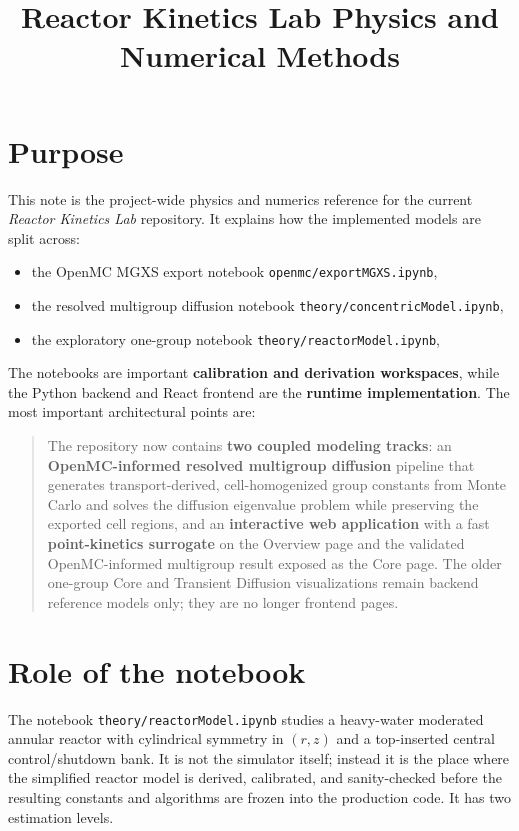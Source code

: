 \documentclass[11pt]{article}
\title{Reactor Kinetics Lab Physics and Numerical Methods}
\author{}
\date{}
\begin{document}
\maketitle

\section{Purpose}

This note is the project-wide physics and numerics reference for the current
\emph{Reactor Kinetics Lab} repository.  It explains how the implemented models
are split across:
\begin{itemize}
  \item the OpenMC MGXS export notebook \texttt{openmc/exportMGXS.ipynb},
  \item the resolved multigroup diffusion notebook
        \texttt{theory/concentricModel.ipynb},
  \item the exploratory one-group notebook \texttt{theory/reactorModel.ipynb},
\end{itemize}

The notebooks are important \textbf{calibration and derivation workspaces}, while
the Python backend and React frontend are the \textbf{runtime implementation}.
The most important architectural points are:

\begin{quote}
The repository now contains \textbf{two coupled modeling tracks}: an
\textbf{OpenMC-informed resolved multigroup diffusion} pipeline that generates
transport-derived, cell-homogenized group constants from Monte Carlo and solves
the diffusion eigenvalue problem while preserving the exported cell regions,
and an \textbf{interactive web application} with a fast
\textbf{point-kinetics surrogate} on the Overview page and the validated
OpenMC-informed multigroup result exposed as the Core page.  The older
one-group Core and Transient Diffusion visualizations remain backend reference
models only; they are no longer frontend pages.
\end{quote}

\section{Role of the notebook}

The notebook \texttt{theory/reactorModel.ipynb} studies a heavy-water moderated
annular reactor with cylindrical symmetry in $(r,z)$ and a top-inserted central
control/shutdown bank.  It is not the simulator itself; instead it is the place
where the simplified reactor model is derived, calibrated, and sanity-checked
before the resulting constants and algorithms are frozen into the production
code.  It has two estimation levels.
\end{document}
